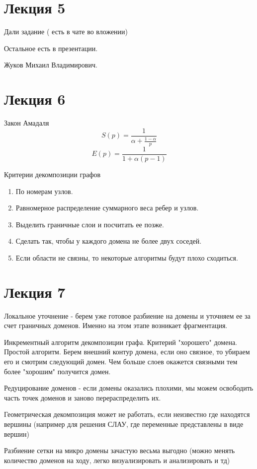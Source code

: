 \documentclass[14pt]{extarticle}
\begin{document}
\section{Лекция 5}

Дали задание ( есть в чате во вложении)

Остальное есть в презентации.

Жуков Михаил Владимирович.

\section{Лекция 6}

Закон Амадаля
\[ S(p) = \frac{1}{\alpha + \frac{1-\alpha}{p}} \]
\[ E(p) = \frac{1}{1+\alpha(p-1)} \]

Критерии декомпозиции графов
\begin{enumerate}
	\item По номерам узлов.
	\item Равномерное распределение суммарного веса ребер и узлов.
	\item Выделить граничные слои и посчитать ее позже.
	\item Сделать так, чтобы у каждого домена не более двух соседей.
	\item Если области не связны, то некоторые алгоритмы будут плохо сходиться.
\end{enumerate}

\section{Лекция 7}

Локальное уточнение - берем уже готовое разбиение на домены и уточняем ее за счет граничных доменов. Именно на этом этапе возникает фрагментация.

Инкрементный алгоритм декомпозиции графа.
Критерий "хорошего" домена. Простой алгоритм. Берем внешний контур домена, если оно связное, то убираем его и смотрим следующий домен. Чем больше слоев окажется связными тем более "хорошим" получится домен.

Редуцирование доменов - если домены оказались плохими, мы можем освободить часть точек доменов и заново перераспределить их.

Геометрическая декомпозиция может не работать, если неизвестно где находятся вершины (например для решения СЛАУ, где переменные представлены в виде вершин)

Разбиение сетки на микро домены зачастую весьма выгодно (можно менять количество доменов на ходу, легко визуализировать и анализировать и тд)
\end{document}
